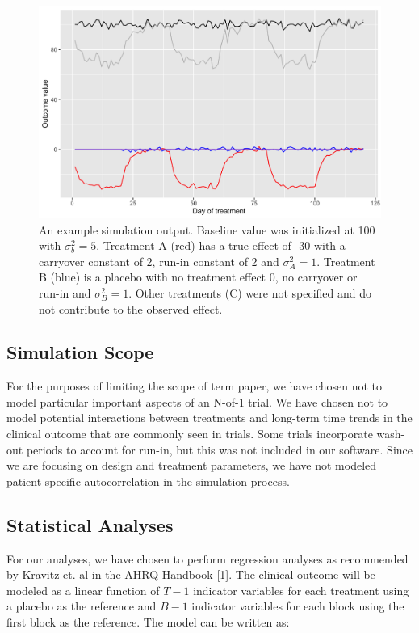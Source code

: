 \documentclass[11pt,]{article}
\begin{document}
\begin{figure}

{\centering \includegraphics[width=0.8\linewidth]{./img/simulation-output} 

}

\caption{An example simulation output. Baseline value was initialized at 100 with $\sigma_b^2 = 5$. Treatment A (red) has a true effect of -30 with a carryover constant of 2, run-in constant of 2 and $\sigma^2_A = 1$. Treatment B (blue) is a placebo with no treatment effect 0, no carryover or run-in and $\sigma^2_B = 1$. Other treatments (C) were not specified and do not contribute to the observed effect.}\label{fig:unnamed-chunk-2}
\end{figure}

\subsection{Simulation Scope}\label{simulation-scope}

For the purposes of limiting the scope of term paper, we have chosen not
to model particular important aspects of an N-of-1 trial. We have chosen
not to model potential interactions between treatments and long-term
time trends in the clinical outcome that are commonly seen in trials.
Some trials incorporate wash-out periods to account for run-in, but this
was not included in our software. Since we are focusing on design and
treatment parameters, we have not modeled patient-specific
autocorrelation in the simulation process.

\subsection{Statistical Analyses}\label{statistical-analyses}

For our analyses, we have chosen to perform regression analyses as
recommended by Kravitz et. al in the AHRQ Handbook {[}1{]}. The clinical
outcome will be modeled as a linear function of \(T-1\) indicator
variables for each treatment using a placebo as the reference and
\(B-1\) indicator variables for each block using the first block as the
reference. The model can be written as:
\end{document}
